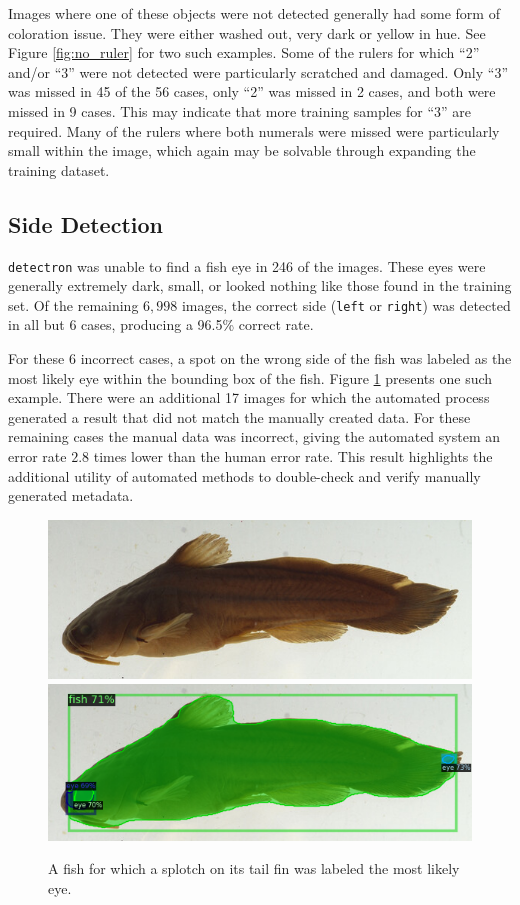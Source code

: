 \documentclass[conference]{IEEEtran}
\begin{document}
Images where one of these objects were not detected generally had some form of coloration issue. They were either washed out, very dark or yellow in hue.
See Figure \ref{fig:no_ruler} for two such examples.
Some of the rulers for which ``2'' and/or ``3'' were not detected were particularly scratched and damaged. Only ``3'' was missed in 45 of the 56 cases, only ``2'' was missed in 2 cases, and both were missed in 9 cases. This may indicate that more training samples for ``3'' are required. Many of the rulers where both numerals were missed were particularly small within the image, which again may be solvable through expanding the training dataset.


\subsection{Side Detection}
\verb|detectron| was unable to find a fish eye
in 246 of the images. These eyes were generally extremely dark, small, or looked nothing like those found in the training set. Of the remaining \(6,998\) images, the correct side
(\verb|left| or \verb|right|) was detected in all but 6 cases, producing
a 96.5\% correct rate.

For these 6 incorrect cases, a spot on the wrong side of the fish was
labeled as the most likely eye within the bounding box of the fish.
Figure \ref{fig:wrong_eye} presents one such example.
There were an additional 17 images for which the automated process generated a result that did not match the manually created data. For these remaining cases the manual data was incorrect, giving the automated system an error rate \(2.8\) times lower than the human error rate.
This result highlights the additional utility of automated methods to
double-check and verify manually generated metadata.

\begin{figure}[H]
  \centering
  \includegraphics[width=0.49\linewidth]{images/wrong_side_orig}
  \includegraphics[width=0.49\linewidth]{images/wrong_side1}
  \caption{A fish for which a splotch on its tail fin was labeled the most likely eye.}
  \label{fig:wrong_eye}
\end{figure}
\end{document}

